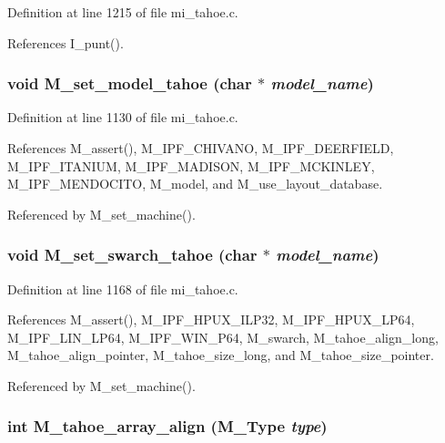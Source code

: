 Definition at line 1215 of file mi\_\-tahoe.c.

References I\_\-punt().
\subsubsection{\setlength{\rightskip}{0pt plus 5cm}void M\_\-set\_\-model\_\-tahoe (char $\ast$ {\em model\_\-name})}\label{mi__tahoe_8c_b89c7354a24ed1af09c5050eaa5faaf7}




Definition at line 1130 of file mi\_\-tahoe.c.

References M\_\-assert(), M\_\-IPF\_\-CHIVANO, M\_\-IPF\_\-DEERFIELD, M\_\-IPF\_\-ITANIUM, M\_\-IPF\_\-MADISON, M\_\-IPF\_\-MCKINLEY, M\_\-IPF\_\-MENDOCITO, M\_\-model, and M\_\-use\_\-layout\_\-database.

Referenced by M\_\-set\_\-machine().
\subsubsection{\setlength{\rightskip}{0pt plus 5cm}void M\_\-set\_\-swarch\_\-tahoe (char $\ast$ {\em model\_\-name})}\label{mi__tahoe_8c_61dc2747abad23fb15b2b4dfcc342b6d}




Definition at line 1168 of file mi\_\-tahoe.c.

References M\_\-assert(), M\_\-IPF\_\-HPUX\_\-ILP32, M\_\-IPF\_\-HPUX\_\-LP64, M\_\-IPF\_\-LIN\_\-LP64, M\_\-IPF\_\-WIN\_\-P64, M\_\-swarch, M\_\-tahoe\_\-align\_\-long, M\_\-tahoe\_\-align\_\-pointer, M\_\-tahoe\_\-size\_\-long, and M\_\-tahoe\_\-size\_\-pointer.

Referenced by M\_\-set\_\-machine().
\subsubsection{\setlength{\rightskip}{0pt plus 5cm}int M\_\-tahoe\_\-array\_\-align (\bf{M\_\-Type} {\em type})}\label{mi__tahoe_8c_c90662ba62bbe78bb455d3bb4b08802e}




